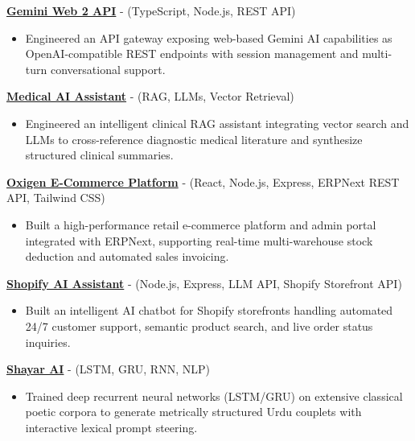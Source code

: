 \documentclass[11pt]{article}
\begin{document}
\href{https://github.com/usmanagro7c-eng/Gemini-Web-2-API}{\textbf{Gemini Web 2 API}} - (TypeScript, Node.js, REST API)  
\begin{itemize}[noitemsep,topsep=2pt] 
  \item Engineered an API gateway exposing web-based Gemini AI capabilities as OpenAI-compatible REST endpoints with session management and multi-turn conversational support.
\end{itemize}

\href{https://github.com/MaAn-41/RAG-for-Diagnostic-Reasoning-for-Clinical-Notes}{\textbf{Medical AI Assistant}} - (RAG, LLMs, Vector Retrieval)  
\begin{itemize}[noitemsep,topsep=2pt] 
  \item Engineered an intelligent clinical RAG assistant integrating vector search and LLMs to cross-reference diagnostic medical literature and synthesize structured clinical summaries.
\end{itemize}

\href{https://github.com/usmanagro7c-eng/Oxigen-Website}{\textbf{Oxigen E-Commerce Platform}} - (React, Node.js, Express, ERPNext REST API, Tailwind CSS)  
\begin{itemize}[noitemsep,topsep=2pt] 
  \item Built a high-performance retail e-commerce platform and admin portal integrated with ERPNext, supporting real-time multi-warehouse stock deduction and automated sales invoicing.
\end{itemize}

\href{https://github.com/usmanagro7c-eng/Shopify-Chatbot}{\textbf{Shopify AI Assistant}} - (Node.js, Express, LLM API, Shopify Storefront API)  
\begin{itemize}[noitemsep,topsep=2pt] 
  \item Built an intelligent AI chatbot for Shopify storefronts handling automated 24/7 customer support, semantic product search, and live order status inquiries.
\end{itemize}

\href{https://github.com/MaAn-41/Shayar-AI}{\textbf{Shayar AI}} - (LSTM, GRU, RNN, NLP)  
\begin{itemize}[noitemsep,topsep=2pt] 
  \item Trained deep recurrent neural networks (LSTM/GRU) on extensive classical poetic corpora to generate metrically structured Urdu couplets with interactive lexical prompt steering.
\end{itemize}
\end{document}
